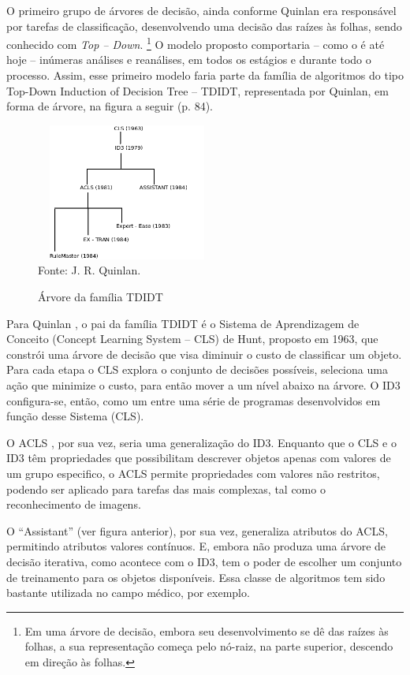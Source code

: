 O primeiro grupo de árvores de decisão, ainda conforme Quinlan \cite{Quinlan86inductionof} era responsável por tarefas de classificação, desenvolvendo uma decisão das raízes às folhas, sendo conhecido com \textit{Top -- Down}. 
\footnote{ Em uma árvore de decisão, embora seu desenvolvimento se dê das raízes às folhas, a sua representação começa pelo nó-raiz, na parte superior, descendo em direção às folhas.} O modelo proposto comportaria – como o é até hoje – inúmeras análises e reanálises, em todos os estágios e durante todo o processo. Assim, esse primeiro modelo faria parte da família de algoritmos do tipo Top-Down Induction of Decision Tree – TDIDT, representada por Quinlan, em forma de árvore, na figura a seguir (p. 84).

\begin{figure}[!ht]
	\centering
	\caption{Árvore da família TDIDT}
	\includegraphics[width=60mm, height=45mm]{Figuras/Arvore/TDIDT.png}\\
	\tiny Fonte: J. R. Quinlan. 
\end{figure} 

Para Quinlan \cite{Quinlan86inductionof}, o pai da família TDIDT é o Sistema de Aprendizagem de Conceito (Concept Learning System – CLS) de Hunt, proposto em 1963, que constrói uma árvore de decisão que visa diminuir o custo de classificar um objeto. Para cada etapa o CLS explora o conjunto de decisões possíveis, seleciona uma ação que minimize o custo, para então mover a um nível abaixo na árvore. O ID3 configura-se, então, como um entre uma série de programas desenvolvidos em função desse Sistema (CLS).

O ACLS \cite{Quinlan86inductionof}, por sua vez, seria uma generalização do ID3. Enquanto que o CLS e o ID3 têm propriedades que possibilitam descrever objetos apenas com valores de um grupo especifico, o ACLS permite propriedades com valores não restritos, podendo ser aplicado para tarefas das mais complexas, tal como o reconhecimento de imagens.

O “Assistant” (ver figura anterior), por sua vez, generaliza atributos do ACLS, permitindo atributos valores contínuos. E, embora não produza uma árvore de decisão iterativa, como acontece com o ID3, tem o poder de escolher um conjunto de treinamento para os objetos disponíveis. Essa classe de algoritmos tem sido bastante utilizada no campo médico, por exemplo.


